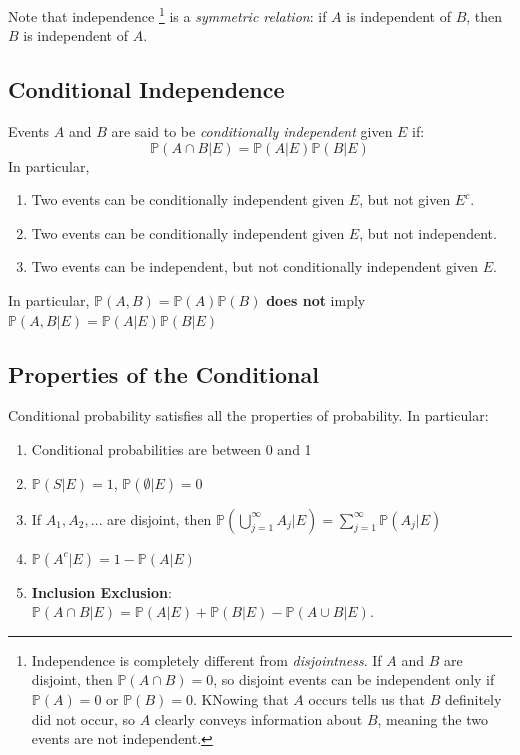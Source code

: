 \documentclass{article}
\begin{document}
Note that independence \footnote{Independence is completely different from \textit{disjointness}. If $A$ and $B$ are disjoint, then $ \mathbb{P}(A \cap B) = 0$, so disjoint events can be independent only if $ \mathbb{P}(A) = 0$ or $ \mathbb{P}(B) = 0$. KNowing that $A$ occurs tells us that $B$ definitely did not occur, so $A$ clearly conveys information about $B$, meaning the two events are not independent.} is a \textit{symmetric relation}: if $A$ is independent of $B$, then $B$ is independent of $A$.

\subsection{Conditional Independence}

\begin{definition}
    Events $A$ and $B$ are said to be \textit{conditionally independent} given $E$ if: \begin{equation}
        \mathbb{P}(A \cap B | E) = \mathbb{P} (A | E) \mathbb{P} (B | E)
    \end{equation} In particular, \begin{enumerate}
        \item Two events can be conditionally independent given $E$, but not given $E^{c}$.
        \item Two events can be conditionally independent given $E$, but not independent. 
        \item Two events can be independent, but not conditionally independent given $E$. 
    \end{enumerate}  
\end{definition} In particular, $ \mathbb{P}(A, B) = \mathbb{P}(A) \mathbb{P}(B)$ \textbf{does not} imply $ \mathbb{P}(A, B | E) = \mathbb{P} (A |E ) \mathbb{P}(B|E)$

\subsection{Properties of the Conditional}

Conditional probability satisfies all the properties of probability. In particular:

\begin{enumerate}
    \item Conditional probabilities are between 0 and 1
    \item $ \mathbb{P}(S | E) = 1$, $ \mathbb{P}(\emptyset | E) = 0$
    \item If $A_{1}, A_{2}, \dots$ are disjoint, then $ \mathbb{P}(\bigcup_{j=1}^{\infty} A_j | E) = \sum_{j=1}^{\infty} \mathbb{P}(A_j | E) $
    \item $ \mathbb{P}(A^{c}|E) = 1 - \mathbb{P}(A | E)$
    \item \textbf{Inclusion Exclusion}: $ \mathbb{P}(A \cap B | E) = \mathbb{P}(A | E) + \mathbb{P}(B|E) - \mathbb{P}(A \cup B | E )$.
\end{enumerate} 
\end{document}
